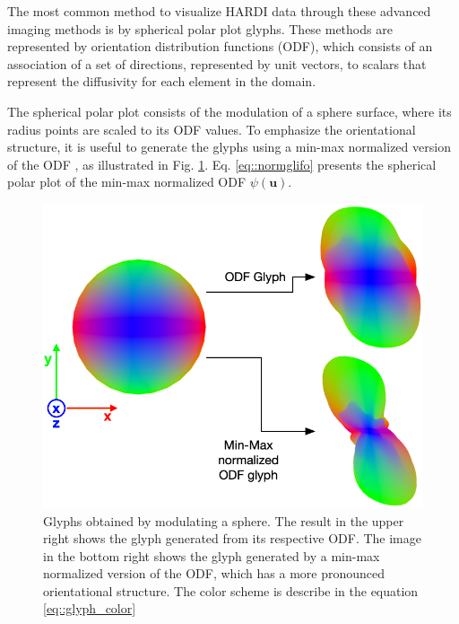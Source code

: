 \documentclass[twoside,twocolumn,10pt]{article}
\begin{document}
The most common method to visualize HARDI data through these advanced imaging methods is by spherical polar plot glyphs. These methods are represented by orientation distribution functions (ODF), which consists of an association of a set of directions, represented by unit vectors, to scalars that represent the diffusivity for each element in the domain.

The spherical polar plot consists of the modulation of a sphere surface, where its radius points are scaled to its ODF values. To emphasize the orientational structure, it is useful to generate the glyphs using a min-max normalized version of the ODF \cite{TuchQBall2004}, as illustrated in Fig. \ref{fig::intro_glyph}. Eq. \ref{eq::normglifo} presents the spherical polar plot of the min-max normalized ODF $\psi(\bm{u})$.

\begin{figure}[htb]
    \centering
    \includegraphics[width=1.00\linewidth, angle=0]{figs/SphericalMeshModulation.png}
    \caption{Glyphs obtained by modulating a sphere. The result in the upper right shows the glyph generated from its respective ODF. The image in the bottom right shows the glyph generated by a min-max normalized version of the ODF, which has a more pronounced orientational structure. The color scheme is describe in the equation \ref{eq::glyph_color}}
    \label{fig::intro_glyph}
\end{figure}
\end{document}
